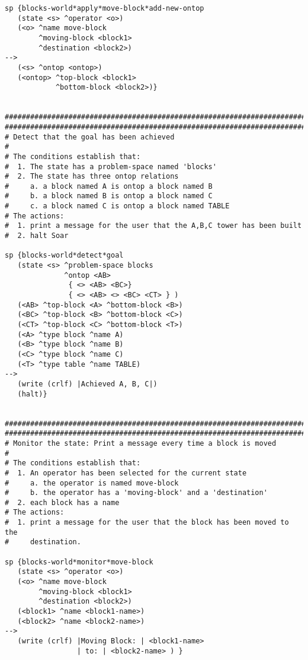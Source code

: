\begin{verbatim}
sp {blocks-world*apply*move-block*add-new-ontop
   (state <s> ^operator <o>)
   (<o> ^name move-block
        ^moving-block <block1>
        ^destination <block2>)
-->
   (<s> ^ontop <ontop>)
   (<ontop> ^top-block <block1>
            ^bottom-block <block2>)}


###############################################################################
###############################################################################
# Detect that the goal has been achieved 
#
# The conditions establish that:
#  1. The state has a problem-space named 'blocks'
#  2. The state has three ontop relations
#     a. a block named A is ontop a block named B
#     b. a block named B is ontop a block named C
#     c. a block named C is ontop a block named TABLE
# The actions:
#  1. print a message for the user that the A,B,C tower has been built
#  2. halt Soar

sp {blocks-world*detect*goal
   (state <s> ^problem-space blocks
              ^ontop <AB> 
               { <> <AB> <BC>}
               { <> <AB> <> <BC> <CT> } )
   (<AB> ^top-block <A> ^bottom-block <B>)
   (<BC> ^top-block <B> ^bottom-block <C>)
   (<CT> ^top-block <C> ^bottom-block <T>)
   (<A> ^type block ^name A)
   (<B> ^type block ^name B)
   (<C> ^type block ^name C)
   (<T> ^type table ^name TABLE)
-->
   (write (crlf) |Achieved A, B, C|)
   (halt)}


###############################################################################
###############################################################################
# Monitor the state: Print a message every time a block is moved
#
# The conditions establish that:
#  1. An operator has been selected for the current state
#     a. the operator is named move-block
#     b. the operator has a 'moving-block' and a 'destination'
#  2. each block has a name
# The actions:
#  1. print a message for the user that the block has been moved to the
#     destination. 

sp {blocks-world*monitor*move-block
   (state <s> ^operator <o>)
   (<o> ^name move-block
        ^moving-block <block1>
        ^destination <block2>)
   (<block1> ^name <block1-name>)
   (<block2> ^name <block2-name>)   
-->
   (write (crlf) |Moving Block: | <block1-name>
                 | to: | <block2-name> ) }
\end{verbatim}
\normalsize
